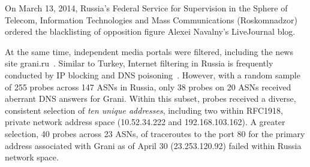 On March 13, 2014, Russia's Federal Service for Supervision in the Sphere of Telecom, Information Technologies and Mass Communications (Roskomnadzor) ordered the blacklisting of opposition figure Alexei Navalny's LiveJournal blog.

At the same time, independent media portals were filtered, including the news site
grani.ru~\cite{ibtimes2014russia}.  Similar to Turkey, Internet filtering in
Russia is frequently conducted by IP blocking and DNS
poisoning~\cite{rugovdns,verkamp2012inferring}.  However, with a random sample
of 255 probes across 147 ASNs in Russia, only 38 probes on 20 ASNs received
aberrant DNS answers for Grani. Within this subset, probes received a diverse, consistent
selection of \emph{ten unique addresses}, including two within RFC1918, private
network address space (10.52.34.222 and 192.168.103.162). A greater selection,
40 probes across 23 ASNs, of traceroutes to the port 80 for the primary address
associated with Grani as of April 30 (23.253.120.92) failed within Russia
network space. 

